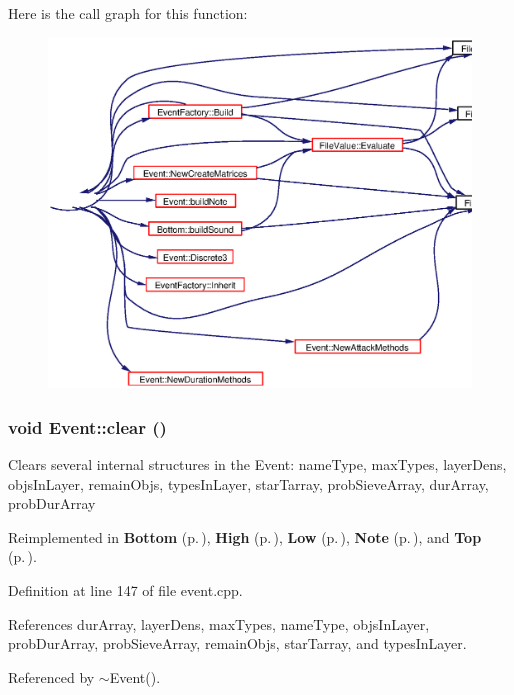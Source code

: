 Here is the call graph for this function:\begin{figure}[H]
\begin{center}
\leavevmode
\includegraphics[width=349pt]{classEvent_a23_cgraph}
\end{center}
\end{figure}
\subsubsection{\setlength{\rightskip}{0pt plus 5cm}void Event::clear ()\hspace{0.3cm}{\tt  [virtual]}}\label{classEvent_a12}


Clears several internal structures in the Event: name\-Type, max\-Types, layer\-Dens, objs\-In\-Layer, remain\-Objs, types\-In\-Layer, star\-Tarray, prob\-Sieve\-Array, dur\-Array, prob\-Dur\-Array 

Reimplemented in {\bf Bottom} {\rm (p.\,\pageref{classBottom_a5})}, {\bf High} {\rm (p.\,\pageref{classHigh_a4})}, {\bf Low} {\rm (p.\,\pageref{classLow_a4})}, {\bf Note} {\rm (p.\,\pageref{classNote_a14})}, and {\bf Top} {\rm (p.\,\pageref{classTop_a4})}.

Definition at line 147 of file event.cpp.

References dur\-Array, layer\-Dens, max\-Types, name\-Type, objs\-In\-Layer, prob\-Dur\-Array, prob\-Sieve\-Array, remain\-Objs, star\-Tarray, and types\-In\-Layer.

Referenced by $\sim$Event().
